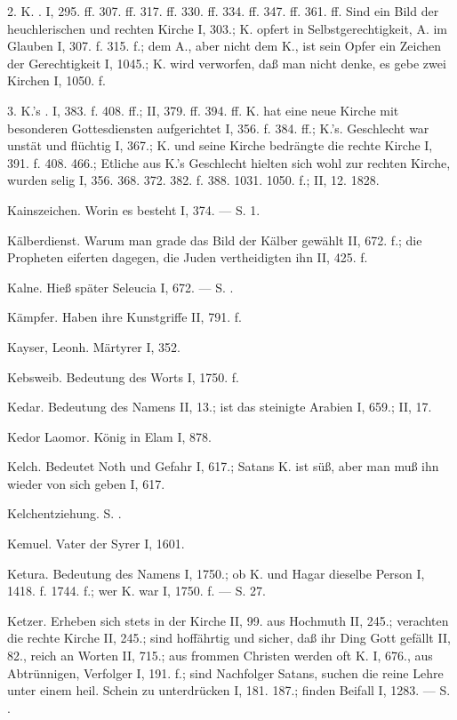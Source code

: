 2. K. . I, 295. ff. 307. ff. 317. ff. 330. ff. 334. ff. 347. ff. 361. ff. Sind ein Bild der heuchlerischen und rechten Kirche I, 303.; K. opfert in Selbstgerechtigkeit, A. im Glauben I, 307. f. 315. f.; dem A., aber nicht dem K., ist sein Opfer ein Zeichen der Gerechtigkeit I, 1045.; K. wird verworfen, daß man nicht denke, es gebe zwei Kirchen I, 1050. f.

3. K.’s . I, 383. f. 408. ff.; II, 379. ff. 394. ff. K. hat eine neue Kirche mit besonderen Gottesdiensten aufgerichtet I, 356. f. 384. ff.; K.’s. Geschlecht war unstät und flüchtig I, 367.; K. und seine Kirche bedrängte die rechte Kirche I, 391. f. 408. 466.; Etliche aus K.’s Geschlecht hielten sich wohl zur rechten Kirche, wurden selig I, 356. 368. 372. 382. f. 388. 1031. 1050. f.; II, 12. 1828.

Kainszeichen. Worin es besteht I, 374. — S.  1.

Kälberdienst. Warum man grade das Bild der Kälber gewählt II, 672. f.; die Propheten eiferten dagegen, die Juden vertheidigten ihn II, 425. f.

Kalne. Hieß später Seleucia I, 672. — S. .

Kämpfer. Haben ihre Kunstgriffe II, 791. f.

Kayser, Leonh. Märtyrer I, 352.

Kebsweib. Bedeutung des Worts I, 1750. f.

Kedar. Bedeutung des Namens II, 13.; ist das steinigte Arabien I, 659.; II, 17.

Kedor Laomor. König in Elam I, 878.

Kelch. Bedeutet Noth und Gefahr I, 617.; Satans K. ist süß, aber man muß ihn wieder von sich geben I, 617.

Kelchentziehung. S. .

Kemuel. Vater der Syrer I, 1601.

Ketura. Bedeutung des Namens I, 1750.; ob K. und Hagar dieselbe Person I, 1418. f. 1744. f.; wer K. war I, 1750. f. — S.  27.

Ketzer. Erheben sich stets in der Kirche II, 99. aus Hochmuth II, 245.; verachten die rechte Kirche II, 245.; sind hoffährtig und sicher, daß ihr Ding Gott gefällt II, 82., reich an Worten II, 715.; aus frommen Christen werden oft K. I, 676., aus Abtrünnigen, Verfolger I, 191. f.; sind Nachfolger Satans, suchen die reine Lehre unter einem heil. Schein zu unterdrücken I, 181. 187.; finden Beifall I, 1283. — S. .

